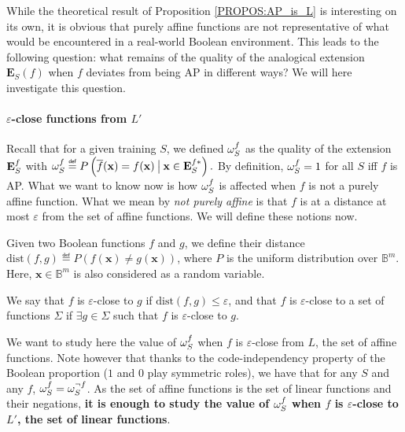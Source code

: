 While the theoretical result of Proposition \ref{PROPOS:AP_is_L} is interesting
on its own, it is obvious that purely affine functions are not representative
of what would be encountered in a real-world Boolean environment.  This leads to the
following question: what remains of the quality of the analogical extension
$\mathbf{E}_S(f)$ when $f$ deviates from being AP in different ways? We will
here investigate this question.

\paragraph{$\varepsilon$-close functions from $L'$\\}

Recall that for a given training $S$, we defined $\omega_{S}^{f}$ as the quality of the
extension $\mathbf{E}_{S}^{f}$ with $\omegasf \eqdef P\left(\albl{\mathbf{x}} = f(\mathbf{x})
\given[\big] \mathbf{x} \in \esfs\right).$ By definition, $\omega_{S}^{f}=1$ for all
$S$ iff $f$ is AP. What we want to know now is how $\omega_{S}^{f}$ is affected when
$f$ is not a purely affine function. What we
mean by \textit{not purely affine} is that $f$ is at a distance at most
$\varepsilon$ from the set
of affine functions. We will define these notions now.

Given two Boolean functions $f$ and $g$, we define their distance
$\text{dist}(f, g) \eqdef P\left(f(\mathbf{x}) \neq
g(\mathbf{x})\right)$, where $P$ is the uniform distribution over
$\mathbb{B}^m$. Here, $\mathbf{x} \in \mathbb{B}^m$ is also considered as a
random variable.

\begin{definition}
We say that $f$ is $\varepsilon$-close to $g$ if $\text{dist}(f, g) \leq
  \varepsilon$, and that $f$ is $\varepsilon$-close to a set of functions $\Sigma$ if
  $\exists g \in \Sigma$ such that $f$ is $\varepsilon$-close to $g$.
\end{definition}

We want to study here the value of $\omega_{S}^{f}$ when $f$ is $\varepsilon$-close from
$L$, the set of affine functions. Note however that thanks to the
code-independency property of the Boolean proportion ($1$ and $0$ play
symmetric roles), we have that for any $S$ and any $f$, $\omega_{S}^{f} =
\omega_S^{\neg f}$. As the set of affine functions is the set of linear
functions and their negations, \textbf{it is enough to study the value of
$\omega_{S}^{f}$ when $f$ is $\varepsilon$-close to $L'$, the set of linear functions}.

